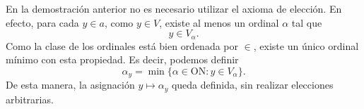 \documentclass[a4,10pt]{aleph-notas}
\begin{document}
\begin{obs}
    En la demostración anterior no es necesario utilizar el axioma de elección. En efecto, para cada \(y\in a\), como \(y\in V\), existe al menos un ordinal \(\alpha\) tal que
    \[
        y\in V_\alpha.
    \]
    Como la clase de los ordinales está bien ordenada por \(\in\), existe un único ordinal mínimo con esta propiedad. Es decir, podemos definir
    \[
        \alpha_y=\min\{\alpha\in\mathrm{ON}:y\in V_\alpha\}.
    \]
    De esta manera, la asignación \(y\mapsto \alpha_y\) queda definida, sin realizar elecciones arbitrarias.
\end{obs}
\end{document}
